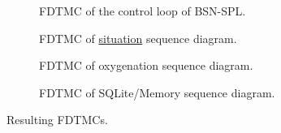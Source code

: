 %




\begin{figure}[!hbt]
  \centering
  \begin{subfigure}[t]{\textwidth}
    \resizebox{\linewidth}{!}{
	    \centering
	    
    }
    \caption{FDTMC of the control loop of BSN-SPL.}
    \label{fig:bsnControlLoopFDTMC}
  \end{subfigure}

  \begin{subfigure}[t]{\textwidth}
    \resizebox{\linewidth}{!}{
	    \centering
	    
    }
    \caption{FDTMC of \underline{situation} sequence diagram.}
    \label{fig:situationFDTMC}
  \end{subfigure}

  \begin{subfigure}[t]{\textwidth}
    \resizebox{\linewidth}{!}{
	    \centering
	    
    }
    \caption{FDTMC of oxygenation sequence diagram.}
    \label{fig:oxygenationFDTMC}
  \end{subfigure}

  \begin{subfigure}[t]{0.5\textwidth}
    \resizebox{\linewidth}{!}{
	    \centering
	    
    }
    \caption{FDTMC of SQLite/Memory sequence diagram.}
    \label{fig:persistenceFDTMC}
  \end{subfigure}
\centering
\caption{Resulting FDTMCs.}
\label{fig:resultingFDTMCs}
\end{figure}

